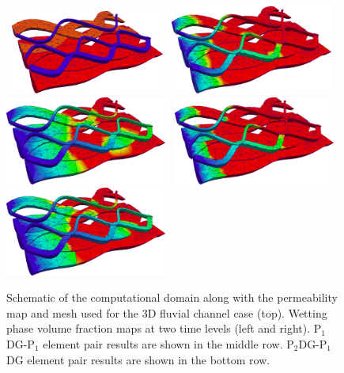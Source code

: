 \documentclass[times]{fldauth}
\newcommand{\PN}[2][error]{P$_{#1}$DG-P$_{#2}$}
\begin{document}
\begin{figure}[h!]
  \vbox{
    \hbox{
      \hspace{3.5cm} \includegraphics[width=0.45\textwidth]{permeability_map}}
    \vspace{0.1cm}
    \hbox{
      \hspace{0.0cm}\includegraphics[width=0.475\textwidth]{phase_vol_fraction_vtu10}
      \hspace{0.0cm}\includegraphics[width=0.475\textwidth]{phase_vol_fraction_vtu20}}
    \vspace{0.1cm}
    \hbox{
      \hspace{0.0cm}\includegraphics[width=0.475\textwidth]{phase_vol_fraction_DGvtu10}
      \hspace{0.0cm}\includegraphics[width=0.475\textwidth]{phase_vol_fraction_DGvtu20}}}
  \caption{Schematic of the computational domain along with the
    permeability map and mesh used for the 3D fluvial channel case
    (top). Wetting phase volume fraction maps at two time levels
    (left and right). \PN[1]{1} element pair results are shown in the
    middle row. \PN[2]{1}DG element pair results are shown in the
    bottom row.
    \label{fig:fluvial_model}}
\end{figure}
\end{document}
